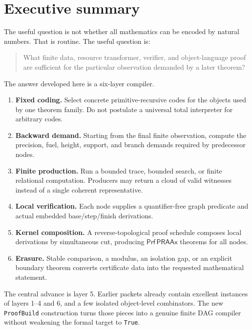 \documentclass[11pt]{article}
\newcommand{\PRAAx}{\mathsf{PRAAx}}
\newcommand{\Prf}{\mathsf{Prf}}
\begin{document}
\tableofcontents
\newpage

\section{Executive summary}

The useful question is not whether all mathematics can be encoded by natural
numbers.  That is routine.  The useful question is:

\begin{quote}
What finite data, resource transformer, verifier, and object-language proof are
sufficient for the particular observation demanded by a later theorem?
\end{quote}

The answer developed here is a six-layer compiler.

\begin{enumerate}
\item \textbf{Fixed coding.}  Select concrete primitive-recursive codes for the
      objects used by one theorem family.  Do not postulate a universal total
      interpreter for arbitrary codes.
\item \textbf{Backward demand.}  Starting from the final finite observation,
      compute the precision, fuel, height, support, and branch demands required
      by predecessor nodes.
\item \textbf{Finite production.}  Run a bounded trace, bounded search, or
      finite relational computation.  Producers may return a cloud of valid
      witnesses instead of a single coherent representative.
\item \textbf{Local verification.}  Each node supplies a quantifier-free graph
      predicate and actual embedded base/step/finish derivations.
\item \textbf{Kernel composition.}  A reverse-topological proof schedule
      composes local derivations by simultaneous cut, producing
      \(\Prf\,\PRAAx\) theorems for all nodes.
\item \textbf{Erasure.}  Stable comparison, a modulus, an isolation gap, or an
      explicit boundary theorem converts certificate data into the requested
      mathematical statement.
\end{enumerate}

The central advance is layer 5.  Earlier packets already contain excellent
instances of layers 1--4 and 6, and a few isolated object-level combinators.
The new \texttt{ProofBuild} construction turns those pieces into a genuine
finite DAG compiler without weakening the formal target to \texttt{True}.
\end{document}
